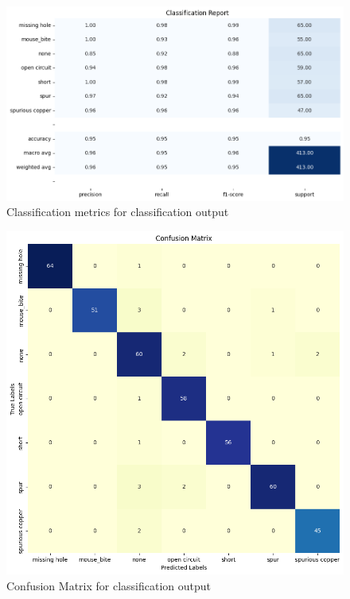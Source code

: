 \documentclass[12pt]{article}
\begin{document}
\bigskip
														  
\begin{figure}[H]
    \centering
    \includegraphics[width=\textwidth]{./graphics/RESUNET_classification_report_graphical_v240618_1.png}
    \caption{Classification metrics for classification output}
    \label{fig:unet_classification_report}
\end{figure}

														
\begin{figure}[H]
    \centering
    \includegraphics[width=0.7\paperwidth,height=0.7\paperheight,keepaspectratio]{./graphics/RESUNET_confusion_matrix_v240618_1.png}
			  
    \caption{Confusion Matrix for classification output}
    \label{fig:unet_confusion}
\end{figure}
\restoregeometry
		
\end{document}
